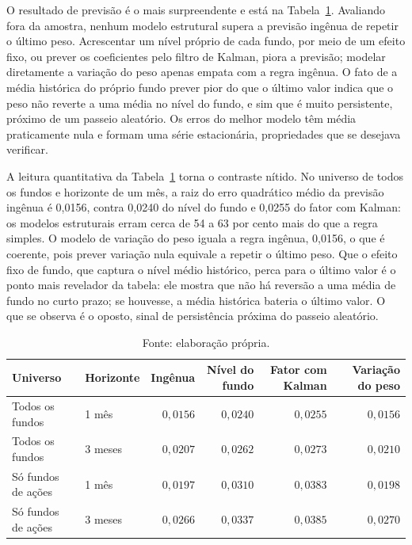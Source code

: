 \documentclass[12pt,a4paper]{article}
\begin{document}
O resultado de previsão é o mais surpreendente e está na Tabela~\ref{tab:fc}. Avaliando fora da
amostra, nenhum modelo estrutural supera a previsão ingênua de repetir o último peso. Acrescentar
um nível próprio de cada fundo, por meio de um efeito fixo, ou prever os coeficientes pelo filtro
de Kalman, piora a previsão; modelar diretamente a variação do peso apenas empata com a regra
ingênua. O fato de a média histórica do próprio fundo prever pior do que o último valor indica que
o peso não reverte a uma média no nível do fundo, e sim que é muito persistente, próximo de um
passeio aleatório. Os erros do melhor modelo têm média praticamente nula e formam uma série
estacionária, propriedades que se desejava verificar.

A leitura quantitativa da Tabela~\ref{tab:fc} torna o contraste nítido. No universo de todos os
fundos e horizonte de um mês, a raiz do erro quadrático médio da previsão ingênua é 0,0156, contra
0,0240 do nível do fundo e 0,0255 do fator com Kalman: os modelos estruturais erram cerca de 54 a
63 por cento mais do que a regra simples. O modelo de variação do peso iguala a regra ingênua,
0,0156, o que é coerente, pois prever variação nula equivale a repetir o último peso. Que o efeito
fixo de fundo, que captura o nível médio histórico, perca para o último valor é o ponto mais
revelador da tabela: ele mostra que não há reversão a uma média de fundo no curto prazo; se
houvesse, a média histórica bateria o último valor. O que se observa é o oposto, sinal de
persistência próxima do passeio aleatório.

\begin{table}[h]\centering\small
\caption{Erro de previsão fora da amostra, medido pela raiz do erro quadrático médio, nos
horizontes de um e de três meses.}
\label{tab:fc}
\begin{tabular}{@{}llrrrr@{}}
\toprule
Universo & Horizonte & Ingênua & Nível do fundo & Fator com Kalman & Variação do peso \\
\midrule
Todos os fundos      & 1 mês  & $0{,}0156$ & $0{,}0240$ & $0{,}0255$ & $0{,}0156$ \\
Todos os fundos      & 3 meses& $0{,}0207$ & $0{,}0262$ & $0{,}0273$ & $0{,}0210$ \\
Só fundos de ações   & 1 mês  & $0{,}0197$ & $0{,}0310$ & $0{,}0383$ & $0{,}0198$ \\
Só fundos de ações   & 3 meses& $0{,}0266$ & $0{,}0337$ & $0{,}0385$ & $0{,}0270$ \\
\bottomrule
\end{tabular}
\caption*{\footnotesize Fonte: elaboração própria.}
\end{table}
\end{document}

